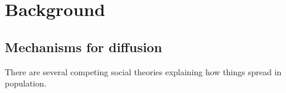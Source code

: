 \documentclass[phd,tocprelim]{cornell}
\begin{document}




\chapter{Background}





\section{Mechanisms for diffusion}
There are several competing social theories explaining how things spread in population. 
\end{document}
